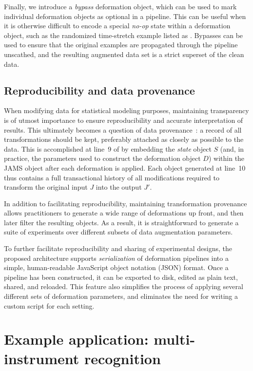 \documentclass{article}
\begin{document}
Finally, we introduce a \emph{bypass} deformation object, which can be used to mark
individual deformation objects as optional in a pipeline.  This can be useful when it is
otherwise difficult to encode a special \emph{no-op} state within a deformation object,
such as the randomized time-stretch example listed as .  Bypasses
can be used to ensure that the original examples are propagated through the
pipeline unscathed, and the resulting augmented data set is a strict superset of the
clean data.

\subsection{Reproducibility and data provenance}
\label{sec:reproducibility}
When modifying data for statistical modeling purposes, maintaining transparency is of
utmost importance to ensure reproducibility and accurate interpretation of results.
This ultimately becomes a question of data provenance~\cite{buneman2000data}: a record of
all transformations should be kept, preferably attached as closely as possible to the data.
This is accomplished at line~9 of  by embedding the
\emph{state} object $S$ (and, in practice, the parameters used to construct the
deformation object $D$) within the JAMS object after each deformation is applied.
Each object generated at line~10 thus contains a full transactional history of all
modifications required to transform the original input $J$ into the output $J'$.

In addition to facilitating reproducibility, maintaining transformation provenance allows
practitioners to generate a wide range of deformations up front, and then later filter the
resulting objects.  As a result, it is straightforward to generate a suite of experiments
over different subsets of data augmentation parameters.

To further facilitate reproducibility and sharing of experimental designs, the proposed
architecture supports \emph{serialization} of deformation pipelines into a simple,
human-readable JavaScript object notation (JSON) format.
Once a pipeline has been constructed, it can be exported to
disk, edited as plain text, shared, and reloaded.  This feature also simplifies the
process of applying several different sets of deformation parameters, and eliminates the
need for writing a custom script for each setting.

\section{Example application: multi-instrument recognition}
\end{document}
